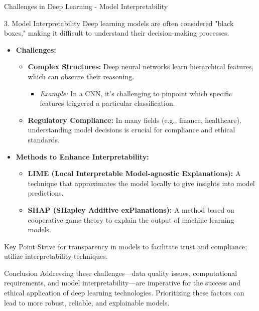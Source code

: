 \documentclass[aspectratio=169]{beamer}
\begin{document}
\begin{frame}[fragile]{Challenges in Deep Learning - Model Interpretability}
    \begin{block}{3. Model Interpretability}
        Deep learning models are often considered "black boxes," making it difficult to understand their decision-making processes.
    \end{block}
    
    \begin{itemize}
        \item \textbf{Challenges:}
        \begin{itemize}
            \item \textbf{Complex Structures:} Deep neural networks learn hierarchical features, which can obscure their reasoning.
            \begin{itemize}
                \item \textit{Example:} In a CNN, it's challenging to pinpoint which specific features triggered a particular classification.
            \end{itemize}
            \item \textbf{Regulatory Compliance:} In many fields (e.g., finance, healthcare), understanding model decisions is crucial for compliance and ethical standards.
        \end{itemize}
        
        \item \textbf{Methods to Enhance Interpretability:}
        \begin{itemize}
            \item \textbf{LIME (Local Interpretable Model-agnostic Explanations):} A technique that approximates the model locally to give insights into model predictions.
            \item \textbf{SHAP (SHapley Additive exPlanations):} A method based on cooperative game theory to explain the output of machine learning models.
        \end{itemize}
    \end{itemize}
    
    \begin{block}{Key Point}
        Strive for transparency in models to facilitate trust and compliance; utilize interpretability techniques.
    \end{block}
\end{frame}

\begin{frame}[fragile]{Conclusion}
    Addressing these challenges—data quality issues, computational requirements, and model interpretability—are imperative for the success and ethical application of deep learning technologies. Prioritizing these factors can lead to more robust, reliable, and explainable models.
\end{frame}
\end{document}
